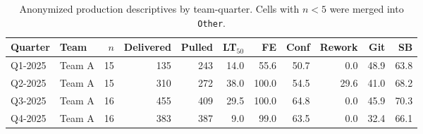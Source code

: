 \begin{table}[htbp]
  \centering
  \caption{Anonymized production descriptives by team-quarter. Cells with $n < 5$ were merged into \texttt{Other}.}
  \label{tab:empirical-desc}
  \scriptsize
  \begin{tabular}{llrrrrrrrrr}
    \toprule
    Quarter & Team & $n$ & Delivered & Pulled & LT$_{50}$ & FE & Conf & Rework & Git & SB \\
    \midrule
    Q1-2025 & Team A & 15 & 135 & 243 & 14.0 & 55.6 & 50.7 & 0.0 & 48.9 & 63.8 \\
    Q2-2025 & Team A & 15 & 310 & 272 & 38.0 & 100.0 & 54.5 & 29.6 & 41.0 & 68.2 \\
    Q3-2025 & Team A & 16 & 455 & 409 & 29.5 & 100.0 & 64.8 & 0.0 & 45.9 & 70.3 \\
    Q4-2025 & Team A & 16 & 383 & 387 & 9.0 & 99.0 & 63.5 & 0.0 & 32.4 & 66.1 \\
    \bottomrule
  \end{tabular}
\end{table}
